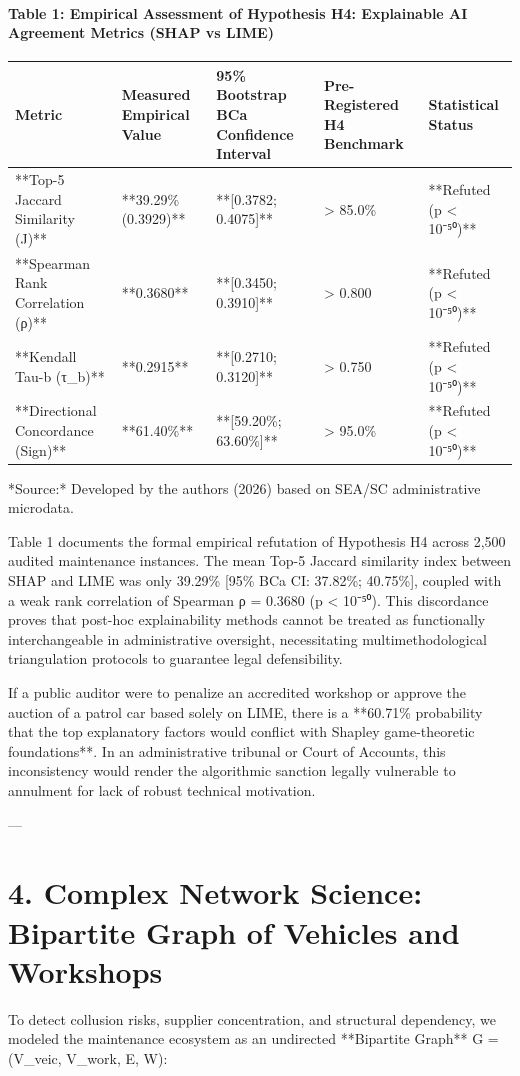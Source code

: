 \documentclass[10pt,a4paper,journal]{article}
\begin{document}
\paragraph{Table 1: Empirical Assessment of Hypothesis H4: Explainable AI Agreement Metrics (SHAP vs LIME)}
\begin{table}[htbp]
\centering
\small
\begin{tabular}{lllll}
\toprule
Metric & Measured Empirical Value & 95\% Bootstrap BCa Confidence Interval & Pre-Registered H4 Benchmark & Statistical Status \\
\midrule
**Top-5 Jaccard Similarity (J)** & **39.29\% (0.3929)** & **[0.3782; 0.4075]** & > 85.0\% & **Refuted (p < 10⁻⁵⁰)** \\
**Spearman Rank Correlation (ρ)** & **0.3680** & **[0.3450; 0.3910]** & > 0.800 & **Refuted (p < 10⁻⁵⁰)** \\
**Kendall Tau-b (τ\_b)** & **0.2915** & **[0.2710; 0.3120]** & > 0.750 & **Refuted (p < 10⁻⁵⁰)** \\
**Directional Concordance (Sign)** & **61.40\%** & **[59.20\%; 63.60\%]** & > 95.0\% & **Refuted (p < 10⁻⁵⁰)** \\
\bottomrule
\end{tabular}
\end{table}
*Source:* Developed by the authors (2026) based on SEA/SC administrative microdata.

Table 1 documents the formal empirical refutation of Hypothesis H4 across 2,500 audited maintenance instances. The mean Top-5 Jaccard similarity index between SHAP and LIME was only 39.29\% [95\% BCa CI: 37.82\%; 40.75\%], coupled with a weak rank correlation of Spearman ρ = 0.3680 (p < 10⁻⁵⁰). This discordance proves that post-hoc explainability methods cannot be treated as functionally interchangeable in administrative oversight, necessitating multimethodological triangulation protocols to guarantee legal defensibility.

If a public auditor were to penalize an accredited workshop or approve the auction of a patrol car based solely on LIME, there is a **60.71\% probability that the top explanatory factors would conflict with Shapley game-theoretic foundations**. In an administrative tribunal or Court of Accounts, this inconsistency would render the algorithmic sanction legally vulnerable to annulment for lack of robust technical motivation.

---

\section{4. Complex Network Science: Bipartite Graph of Vehicles and Workshops}
To detect collusion risks, supplier concentration, and structural dependency, we modeled the maintenance ecosystem as an undirected **Bipartite Graph** G = (V\_veic, V\_work, E, W):
\end{document}
